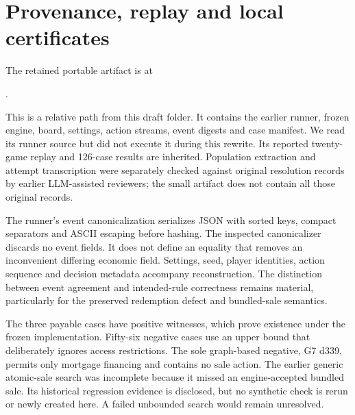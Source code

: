 \section{Provenance, replay and local certificates}

The retained portable artifact is at
\begin{center}\small{}.\end{center}
This is a relative path from this draft folder. It contains the earlier runner, frozen engine, board, settings, action streams, event digests and case manifest. We read its runner source but did not execute it during this rewrite. Its reported twenty-game replay and 126-case results are inherited. Population extraction and attempt transcription were separately checked against original resolution records by earlier LLM-assisted reviewers; the small artifact does not contain all those original records.

The runner's event canonicalization serializes JSON with sorted keys, compact separators and ASCII escaping before hashing. The inspected canonicalizer discards no event fields. It does not define an equality that removes an inconvenient differing economic field. Settings, seed, player identities, action sequence and decision metadata accompany reconstruction. The distinction between event agreement and intended-rule correctness remains material, particularly for the preserved redemption defect and bundled-sale semantics.

The three payable cases have positive witnesses, which prove existence under the frozen implementation. Fifty-six negative cases use an upper bound that deliberately ignores access restrictions. The sole graph-based negative, G7 d339, permits only mortgage financing and contains no sale action. The earlier generic atomic-sale search was incomplete because it missed an engine-accepted bundled sale. Its historical regression evidence is disclosed, but no synthetic check is rerun or newly created here. A failed unbounded search would remain unresolved.

